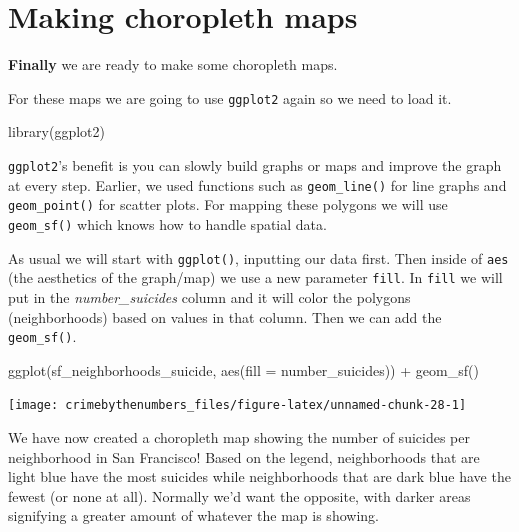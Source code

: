 \documentclass[
  12pt,
]{book}
\newenvironment{Shaded}{\begin{snugshade}}{\end{snugshade}}
\newcommand{\AttributeTok}[1]{\textcolor[rgb]{0.61,0.61,0.61}{#1}}
\newcommand{\FunctionTok}[1]{\textcolor[rgb]{0,0,0}{#1}}
\newcommand{\NormalTok}[1]{#1}
\newcommand{\SpecialCharTok}[1]{\textcolor[rgb]{0,0,0}{#1}}
\begin{document}
\hypertarget{making-choropleth-maps}{%
\section{Making choropleth maps}\label{making-choropleth-maps}}

\textbf{Finally} we are ready to make some choropleth maps.

For these maps we are going to use \texttt{ggplot2} again so we need to load it.

\begin{Shaded}
\begin{Highlighting}[]
\FunctionTok{library}\NormalTok{(ggplot2)}
\end{Highlighting}
\end{Shaded}

\texttt{ggplot2}'s benefit is you can slowly build graphs or maps and improve the graph at every step. Earlier, we used functions such as \texttt{geom\_line()} for line graphs and \texttt{geom\_point()} for scatter plots. For mapping these polygons we will use \texttt{geom\_sf()} which knows how to handle spatial data.

As usual we will start with \texttt{ggplot()}, inputting our data first. Then inside of \texttt{aes} (the aesthetics of the graph/map) we use a new parameter \texttt{fill}. In \texttt{fill} we will put in the \emph{number\_suicides} column and it will color the polygons (neighborhoods) based on values in that column. Then we can add the \texttt{geom\_sf()}.

\begin{Shaded}
\begin{Highlighting}[]
\FunctionTok{ggplot}\NormalTok{(sf\_neighborhoods\_suicide, }\FunctionTok{aes}\NormalTok{(}\AttributeTok{fill =}\NormalTok{ number\_suicides)) }\SpecialCharTok{+}
  \FunctionTok{geom\_sf}\NormalTok{() }
\end{Highlighting}
\end{Shaded}

\begin{center}\texttt{[image: crimebythenumbers\_files/figure-latex/unnamed-chunk-28-1]} \end{center}

We have now created a choropleth map showing the number of suicides per neighborhood in San Francisco! Based on the legend, neighborhoods that are light blue have the most suicides while neighborhoods that are dark blue have the fewest (or none at all). Normally we'd want the opposite, with darker areas signifying a greater amount of whatever the map is showing.
\end{document}
